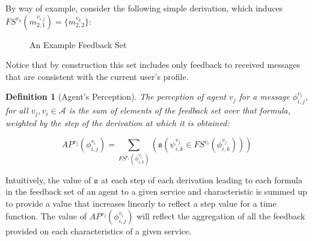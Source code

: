 \documentclass[compsoc, conference, letterpaper, 10pt, times]{IEEEtran}
\newtheorem{definition}{Definition}
\begin{document}
By way of example, consider the following simple derivation, which induces $FS^{v_{k}}(m^{v_{i,j}}_{2,1})=\{m^{v_{k}}_{2,2}\}$: 

\begin{figure*}
\begin{tiny}

	\begin{prooftree}
		
		\end{prooftree}
\end{tiny}


	\caption{An Example Feedback Set}\label{fig:ask}

\end{figure*}

Notice that by construction this set includes only feedback to received messages that are consistent with the current user's profile. 

\begin{definition}[Agent's Perception]
The perception of agent $v_{j}$ for a message $\phi^{v_{i}}_{i,j}$, for all $v_{j}, v_{i} \in \mathcal{A}$ is the sum of elements of the feedback set over that formula, weighted by the step of the derivation at which it is obtained: 

\[
AP^{v_{j}}(\phi^{v_{i}}_{i,j})=\sum_{FS^{v_{i}}(\phi^{v_{j}}_{i,k})}(\mathtt{s}(\psi^{v_{j}}_{i,k} \in FS^{v_{i}}(\phi^{v_{j}}_{i,k})))
\]

\end{definition}

Intuitively, the value of $\mathtt{s}$ at each step of each derivation leading to each formula in the feedback set of an agent to a given service and characteristic is summed up to provide a value that increases linearly to reflect a step value for a time function. The value of $AP^{v_{j}}(\phi^{v_{i}}_{i,j})$ will reflect the aggregation of all the feedback provided on each characteristics of a given service.  
\end{document}
